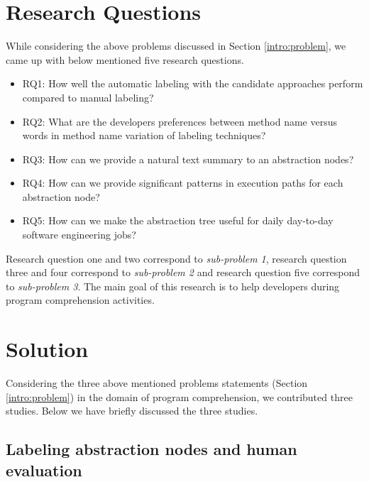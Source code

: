 \section{Research Questions}   
\label{intro:research_questions}
While considering the above problems discussed in Section \ref{intro:problem}, we came up with below mentioned five research questions.
\begin{itemize}
    \item RQ1: How well the automatic labeling with the candidate approaches perform compared to manual labeling?
    \item RQ2: What are the developers preferences between method name versus words in method name variation of labeling techniques?
    \item RQ3: How can we provide a natural text summary to an abstraction nodes?
    \item RQ4: How can we provide significant patterns in execution paths for each abstraction node?
    \item RQ5: How can we make the abstraction tree useful for daily day-to-day software engineering jobs?
    
\end{itemize}

Research question one and two correspond to \emph{sub-problem 1}, research question three and four correspond to \emph{sub-problem 2} and research question five correspond to \emph{sub-problem 3}. The main goal of this research is to help developers during program comprehension activities. 



\section{Solution}
\label{intro:solution}
Considering the three above mentioned problems statements (Section \ref{intro:problem}) in the domain of program comprehension, we contributed three studies. Below we have briefly discussed the three studies.  

\subsection{Labeling abstraction nodes and human evaluation}

